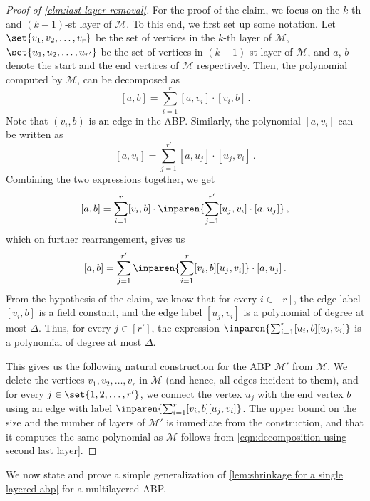 \begin{proof}[Proof of \autoref{clm:last layer removal}]
	For the proof of the claim, we  focus on the $k$-th and $(k-1)$-st layer of $\mathcal{M}$. To this end, we first set up some notation. Let $\set{v_1, v_2, \ldots, v_r}$ be the set of vertices in the $k$-th layer of $\mathcal{M}$, $\set{u_1, u_2, \ldots, u_{r'}}$ be the set of vertices in $(k-1)$-st layer of $\mathcal{M}$, and $a$, $b$ denote the start and the end vertices of $\mathcal{M}$ respectively. Then, the polynomial computed by $\mathcal{M}$, can be decomposed as 
	\[
		[a,b] = \sum_{i = 1}^r [a, v_i] \cdot  [v_i, b]\, .
	\]
	Note that $(v_i,b)$ is an edge in the ABP. Similarly, the polynomial $[a,v_i]$ can be written as 
	\[
		[a,v_i] = \sum_{j = 1}^{r'} [a, u_j] \cdot [u_j, v_i] \, .
	\]
	Combining the two expressions together, we get  
	\[
		[a,b] = \sum_{i = 1}^r [v_i, b] \cdot  \inparen{\sum_{j = 1}^{r'} [u_j,v_i] \cdot [a, u_j]}\, ,
	\]
	which on further rearrangement,  gives us 
	\begin{equation} \label{eqn:decomposition using second last layer}
		[a,b] = \sum_{j = 1}^{r'} \inparen{\sum_{i = 1}^{r} [v_i,b] [u_j, v_i]} \cdot [a, u_j] \, .
	\end{equation}
 	From the hypothesis of the claim, we know that for every $i \in [r]$, the edge label $[v_i,b]$ is a field constant, and the edge label $[u_j, v_i]$ is a polynomial of degree at most $\Delta$. Thus, for every $j \in [r']$, the expression $\inparen{\sum_{i = 1}^{r} [u_i,b] [u_j,v_i]}$ is a polynomial of degree at most $\Delta$.
 	
 	This gives us the following natural construction for the ABP $\mathcal{M}'$ from $\mathcal{M}$. We delete the vertices $v_1, v_2, \ldots, v_r$ in $\mathcal{M}$ (and hence, all edges incident to them), and for every $j \in \set{1, 2, \ldots, r'}$, we connect the vertex $u_j$ with the end vertex $b$ using an edge with label $\inparen{\sum_{i = 1}^{r} [v_i,b] [u_j, v_i]}$. The upper bound on the size and the number of layers of $\mathcal{M}'$ is immediate from the construction, and that it computes the same polynomial as $\mathcal{M}$ follows from \autoref{eqn:decomposition using second last layer}.
 \end{proof}	

We now state and prove a simple generalization of \autoref{lem:shrinkage for a single layered abp} for a multilayered ABP. 
	
